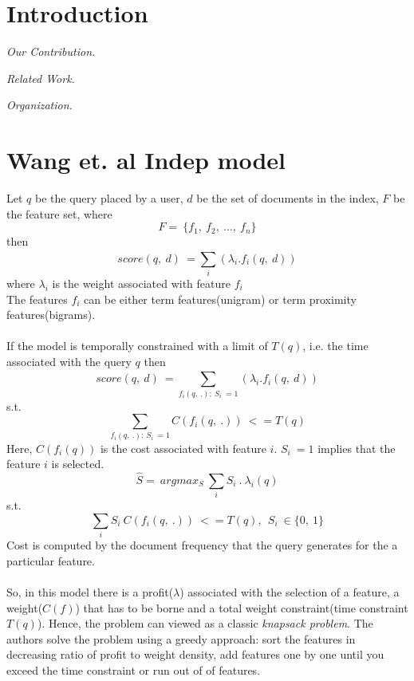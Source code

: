 \documentclass[10pt, conference, compsocconf]{IEEEtran}
\begin{document}
\IEEEpeerreviewmaketitle


\section{Introduction}

\vspace*{0.1cm}
\noindent \emph{Our Contribution.}
 

\vspace*{0.1cm}
\noindent \emph{Related Work.}
\cite{wang:CIKM10}

\vspace*{0.1cm}
\noindent \emph{Organization.}



\section{Wang et. al Indep model}
Let $q$ be the query placed by a user, $d$ be the set of documents in the index, $F$ be the feature set, where
$$F=\ \{f_1,\ f_2,\ \dots,\ f_n\}$$
then \\
$$score(q,\ d)\ = \sum_{i}^{}(\lambda_i .f_i(q,\ d))$$
where $\lambda_i$ is the weight associated with feature $f_i$\\
The features $f_i$ can be either term features(unigram) or term proximity features(bigrams).\\\\
If the model is temporally constrained with a limit of $T(q)$, i.e. the time associated with the query $q$ then \\
$$score(q,\ d)\ = \sum_{f_i(q,\ .):\ S_i\ =1}^{}(\lambda_i .f_i(q,\ d))$$
s.t. \\
$$\sum_{f_i(q,\ .):\ S_i\ =1}C(f_i(q,\ .))\ <= T(q)$$
Here, $C(f_i(q))$ is the cost associated with feature $i$. $S_i\ =1$ implies that the feature $i$ is selected.\\
$$\hat{S}=\ argmax_S\ \sum_{i}S_i\ .\ \lambda_i(q)$$
s.t.\\
$$\sum_{i}S_i\ C(f_i(q,\ .))\ <=T(q),\ \ S_i\ \in\{0,\ 1\}$$
Cost is computed by the document frequency that the query generates for the a particular feature.\\\\
So, in this model there is a profit($\lambda$) associated with the selection of a feature, a weight($C(f)$) that has to be borne and a total weight constraint(time constraint $T(q)$). Hence, the problem can viewed as a classic \textit{knapsack problem}.
The authors solve the problem using a greedy approach: sort the features in decreasing ratio of profit to weight density, add features one by one until you exceed the time constraint or run out of of features.
\end{document}

